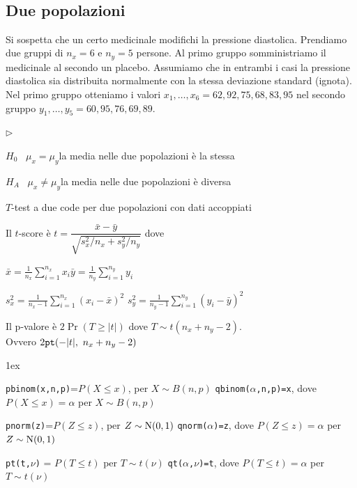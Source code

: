 \documentclass[11pt,openany]{book}
\newcommand{\mylabel}[1]{{\footnotesize\textsf{#1}}\hfill}
\renewenvironment{itemize}
  {\begin{list}{$\triangleright$}{%
   \setlength{\parskip}{0mm}
   \setlength{\topsep}{.2\baselineskip}
   \setlength{\rightmargin}{0mm}
   \setlength{\listparindent}{0mm}
   \setlength{\itemindent}{0mm}
   \setlength{\labelwidth}{3ex}
   \setlength{\itemsep}{.4\baselineskip}
   \setlength{\parsep}{0mm}
   \setlength{\partopsep}{0mm}
   \setlength{\labelsep}{1ex}
   \setlength{\leftmargin}{\labelwidth+\labelsep}
   \let\makelabel\mylabel}}{%
   \end{list}\vspace*{-1.3mm}}
\begin{document}


\clearpage\
\subsection{Due popolazioni}
Si sospetta che un certo medicinale modifichi la pressione diastolica.  Prendiamo due gruppi di $n_x=6$ e $n_y=5$ persone. Al primo gruppo somministriamo il medicinale al secondo un placebo. Assumiamo che in entrambi i casi la pressione diastolica sia distribuita normalmente con la stessa deviazione standard (ignota). Nel primo gruppo otteniamo i valori $x_1,\dots,x_6=62,92,75,68,83,95$ nel secondo gruppo $y_1,\dots,y_5=60,95,76,69,89$.

\begin{itemize}
\item[1.] $H_0$ \ $\mu_x = \mu_y$\hfill la media nelle due popolazioni è la stessa 

\item[2.] $H_A$ \ $\mu_x\neq\mu_y$\hfill la media nelle due popolazioni è diversa 


\item[3.] $T$-test a due code per due popolazioni con dati accoppiati

\item[3.] Il $t$-score è 
$t = \dfrac{\bar x - \bar y}{\sqrt{s^2_x/n_x+s^2_y/n_y}}$ dove 

$\displaystyle\bar x = \frac1{n_x}\sum^{n_x}_{i=1}x_i$\hfil$\displaystyle\bar y = \frac1{n_y}\sum^{n_y}_{i=1}y_i$


$\displaystyle s^2_x= \frac1{n_x-1}\sum^{n_x}_{i=1}(x_i-\bar x)^2$\hfil
$\displaystyle s^2_y= \frac1{n_y-1}\sum^{n_y}_{i=1}(y_i-\bar y)^2$




\item[4.] Il p-valore è $2\Pr(T\ge |t|)$ dove $T\sim t(n_x+n_y-2)$.\\ 
Ovvero $2 {\tt  pt}(-|t|,\  n_x+n_y-2)$
\end{itemize}


\vfill
\parskip1ex
{\hrulefill\scriptsize


{\tt pbinom(x,n,p)}=$P(X\le x)$, per $X\sim B(n,p)$
\hfill 
{\tt qbinom($\alpha$,n,p)=x},  dove $P(X\le x)=\alpha$ per $X\sim B(n,p)$

{\tt pnorm(z)}=$P(Z\le z)$, per $Z\sim {\rm N}(0,1)$
\hfill 
{\tt qnorm($\alpha$)=z},  dove $P(Z\le z)=\alpha$ per $Z\sim {\rm N}(0,1)$

{\tt pt(t,$\nu$)} = $P(T\le t)$ per $T\sim t(\nu)$
\hfill
{\tt qt($\alpha$,$\nu$)=t}, dove $P(T\le t)=\alpha$ per $T\sim t(\nu)$

}
\end{document}
